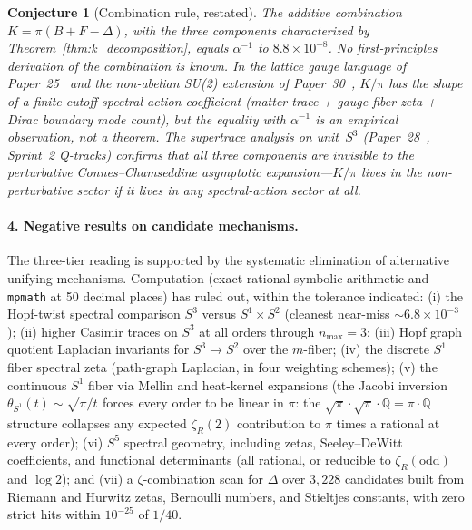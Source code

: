 \documentclass[aps,pra,twocolumn,superscriptaddress,longbibliography]{revtex4-2}
\newtheorem{conjecture}{Conjecture}
\begin{document}
\begin{conjecture}[Combination rule, restated]
\label{conj:k_rule}
The additive combination $K = \pi(B + F - \Delta)$, with the three
components characterized by Theorem~\ref{thm:k_decomposition},
equals $\alpha^{-1}$ to $8.8 \times 10^{-8}$.  No first-principles
derivation of the combination is known.  In the lattice gauge
language of Paper~25~\cite{loutey_paper25} and the non-abelian SU(2)
extension of Paper~30~\cite{loutey_paper30}, $K/\pi$ has the shape
of a finite-cutoff spectral-action coefficient (matter trace +
gauge-fiber zeta + Dirac boundary mode count), but the equality with
$\alpha^{-1}$ is an empirical observation, not a theorem.
The supertrace analysis on unit~$S^3$ (Paper~28~\cite{loutey_paper28},
Sprint~2 Q-tracks) confirms that all three components are invisible
to the perturbative Connes--Chamseddine asymptotic expansion---$K/\pi$
lives in the non-perturbative sector if it lives in any
spectral-action sector at all.
\end{conjecture}

\paragraph{4. Negative results on candidate mechanisms.}
The three-tier reading is supported by the systematic elimination
of alternative unifying mechanisms.  Computation (exact rational
symbolic arithmetic and \texttt{mpmath} at 50 decimal places)
has ruled out, within the tolerance indicated:
(i) the Hopf-twist spectral comparison $S^3$ versus $S^1 \times S^2$
(cleanest near-miss $\sim 6.8 \times 10^{-3}$);
(ii) higher Casimir traces on $S^3$ at all orders through
$n_{\max} = 3$;
(iii) Hopf graph quotient Laplacian invariants for
$S^3 \to S^2$ over the $m$-fiber;
(iv) the discrete $S^1$ fiber spectral zeta (path-graph Laplacian,
in four weighting schemes);
(v) the continuous $S^1$ fiber via Mellin and heat-kernel expansions
(the Jacobi inversion $\theta_{S^1}(t) \sim \sqrt{\pi/t}$ forces every
order to be linear in $\pi$: the $\sqrt{\pi}\cdot\sqrt{\pi}\cdot\mathbb{Q}
= \pi\cdot\mathbb{Q}$ structure collapses any expected $\zeta_R(2)$
contribution to $\pi$ times a rational at every order);
(vi) $S^5$ spectral geometry, including zetas, Seeley--DeWitt
coefficients, and functional determinants (all rational, or
reducible to $\zeta_R(\mathrm{odd})$ and $\log 2$);
and (vii) a $\zeta$-combination scan for $\Delta$ over $3{,}228$
candidates built from Riemann and Hurwitz zetas, Bernoulli numbers,
and Stieltjes constants, with zero strict hits within $10^{-25}$
of $1/40$.
\end{document}
